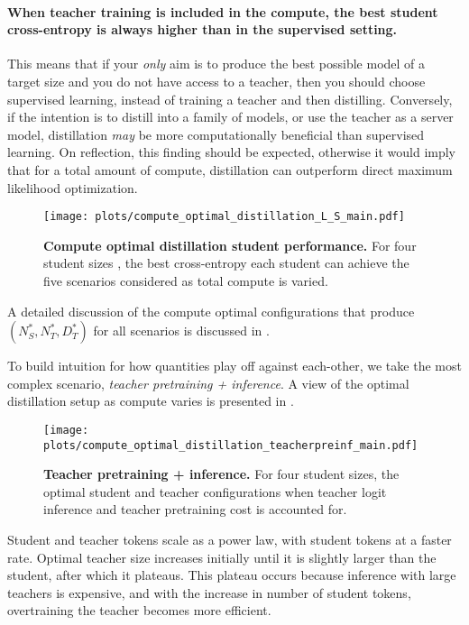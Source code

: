 \paragraph{When teacher training is included in the compute, the best student cross-entropy is always higher than in the supervised setting.}
This means that if your \emph{only} aim is to produce the best possible model of a target size and you do not have access to a teacher, then you should choose supervised learning, instead of training a teacher and then distilling.
Conversely, if the intention is to distill into a family of models, or use the teacher as a server model, distillation \emph{may} be more computationally beneficial than supervised learning.
On reflection, this finding should be expected, otherwise it would imply that for a total amount of compute, distillation can outperform direct maximum likelihood optimization.
\begin{figure}[h]
	\centering
	\texttt{[image: plots/compute\_optimal\_distillation\_L\_S\_main.pdf]}
        \vspace{-0.25cm}
	\caption{\textbf{Compute optimal distillation student performance.}
	For four student sizes , the best cross-entropy each student can achieve the five scenarios considered as total compute is varied.
	}
    \vspace{-0.25cm}
	\label{fig:compute-optimal-distillation-student-loss}
\end{figure}
A detailed discussion of the compute optimal configurations that produce $(N_S^*,N_T^*,D_T^*)$ for all scenarios is discussed in .

To build intuition for how quantities play off against each-other, we take the most complex scenario, \emph{teacher pretraining + inference}.
A view of the optimal distillation setup as compute varies is presented in .
\begin{figure}[h]
	\centering
	\texttt{[image: plots/compute\_optimal\_distillation\_teacherpreinf\_main.pdf]}
    \vspace{-0.25cm}
	\caption{\textbf{Teacher pretraining + inference.} For four student sizes, the optimal student and teacher configurations when teacher logit inference and teacher pretraining cost is accounted for.}
    \vspace{-0.35cm}
	\label{fig:distillation-pretraining-quantities}
\end{figure}
Student and teacher tokens scale as a power law, with student tokens at a faster rate.
Optimal teacher size increases initially until it is slightly larger than the student, after which it plateaus.
This plateau occurs because inference with large teachers is expensive, and with the increase in number of student tokens,  overtraining the teacher becomes more efficient.

